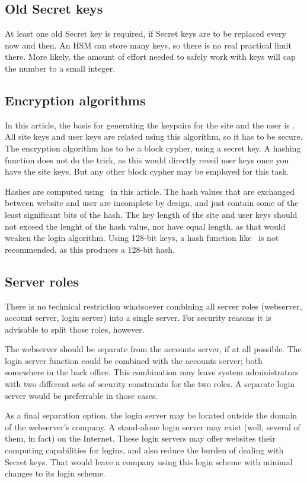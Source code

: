 \subsection{Old Secret keys}
At least one old Secret key is required,
if Secret keys are to be replaced every now and then.
An HSM can store many keys,
so there is no real practical limit there.
More likely,
the amount of effort needed to safely work with keys will cap the number to a small integer.

\subsection{Encryption algorithms}
In this article,
the basis for generating the keypairs for the site and the user is \AES.
All site keys and user keys are related using this algorithm,
so it has to be secure.
The encryption algorithm has to be a block cypher,
using a secret key.
A hashing function does not do the trick,
as this would directly reveil user keys once you have the site keys.
But any other block cypher may be employed for this task.
\par
Hashes are computed using \SHA\ in this article.
The hash values that are exchanged between website and user are incomplete by design,
and just contain some of the least significant bits of the hash.
The key length of the site and user keys
should not exceed the lenght of the hash value,
nor have equal length,
as that would weaken the login algorithm.
Using 128-bit keys, a hash function like \MDV\ is not recommended, as this produces a 128-bit hash.

\subsection{Server roles}
There is no technical restriction whatsoever combining all server roles
(webserver, account server, login server)
into a single server.
For security reasons it is advisable to split those roles, however.
\par
The webserver should be separate from the accounts server, if at all possible.
The login server function could be combined with the accounts server;
both somewhere in the back office.
This combination may leave system administrators with two different sets
of security constraints for the two roles.
A separate login server would be preferrable in those cases.
\par
As a final separation option,
the login server may be located outside the domain of the webserver's company.
A stand-alone login server may exist
(well, several of them, in fact)
on the Internet.
These login servers may offer websites their computing capabilities for logins,
and also reduce the burden of dealing with Secret keys.
That would leave a company using this login scheme with minimal changes to its login scheme.
